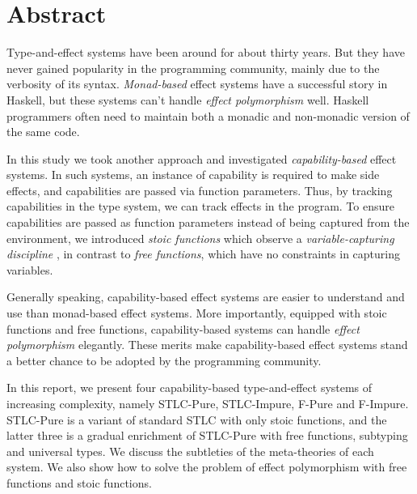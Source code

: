 \section*{\centering Abstract}

Type-and-effect systems have been around for about thirty years. But
they have never gained popularity in the programming community, mainly
due to the verbosity of its syntax. \emph{Monad-based} effect systems
have a successful story in Haskell, but these systems can't handle
\emph{effect polymorphism} well.  Haskell programmers often need to
maintain both a monadic and non-monadic version of the same code.

In this study we took another approach and investigated
\emph{capability-based} effect systems. In such systems, an instance
of capability is required to make side effects, and capabilities are
passed via function parameters. Thus, by tracking capabilities in the
type system, we can track effects in the program. To ensure
capabilities are passed as function parameters instead of being
captured from the environment, we introduced \emph{stoic functions}
which observe a \emph{variable-capturing discipline} , in contrast to
\emph{free functions}, which have no constraints in capturing
variables.

Generally speaking, capability-based effect systems are easier to
understand and use than monad-based effect systems. More importantly,
equipped with stoic functions and free functions, capability-based
systems can handle \emph{effect polymorphism} elegantly. These merits
make capability-based effect systems stand a better chance to be
adopted by the programming community.

In this report, we present four capability-based type-and-effect
systems of increasing complexity, namely STLC-Pure, STLC-Impure,
F-Pure and F-Impure. STLC-Pure is a variant of standard STLC with only
stoic functions, and the latter three is a gradual enrichment of
STLC-Pure with free functions, subtyping and universal types. We
discuss the subtleties of the meta-theories of each system. We also
show how to solve the problem of effect polymorphism with free
functions and stoic functions.
